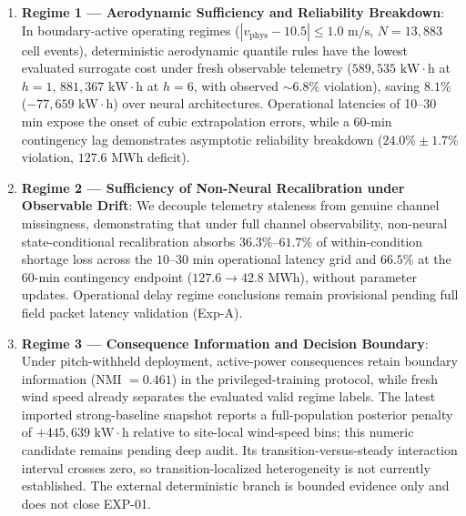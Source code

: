 \documentclass[
  journal]{IEEEtran}
\makeatletter
\providecommand{\tightlist}{%
  \setlength{\itemsep}{0pt}\setlength{\parskip}{0pt}}
\def\section{\@startsection{section}{1}{\z@}{0.75ex plus 0.15ex minus 0.1ex}{0.25ex plus 0.08ex}{\normalfont\footnotesize\bfseries\centering\scshape}}
\makeatother
\begin{document}
\begin{enumerate}
\def\labelenumi{\arabic{enumi}.}
\tightlist
\item
  \textbf{Regime 1 --- Aerodynamic Sufficiency and Reliability
  Breakdown}: In boundary-active operating regimes
  (\(|v_{\text{phys}}-10.5|\le 1.0\text{ m/s}\), \(N=13{,}883\) cell
  events), deterministic aerodynamic quantile rules have the lowest
  evaluated surrogate cost under fresh observable telemetry
  (\(589{,}535\text{ kW}\cdot\text{h}\) at \(h=1\),
  \(881{,}367\text{ kW}\cdot\text{h}\) at \(h=6\), with observed
  \(\sim 6.8\%\) violation), saving \(8.1\%\)
  (\(-77{,}659\text{ kW}\cdot\text{h}\)) over neural architectures.
  Operational latencies of 10--30 min expose the onset of cubic
  extrapolation errors, while a 60-min contingency lag demonstrates
  asymptotic reliability breakdown (\(24.0\% \pm 1.7\%\) violation,
  \(127.6\text{ MWh}\) deficit).
\item
  \textbf{Regime 2 --- Sufficiency of Non-Neural Recalibration under
  Observable Drift}: We decouple telemetry staleness from genuine
  channel missingness, demonstrating that under full channel
  observability, non-neural state-conditional recalibration absorbs
  \(36.3\%\)--\(61.7\%\) of within-condition shortage loss across the
  \(10\)--\(30\) min operational latency grid and \(66.5\%\) at the
  \(60\)-min contingency endpoint (\(127.6 \to 42.8\text{ MWh}\)),
  without parameter updates. Operational delay regime conclusions remain
  provisional pending full field packet latency validation (Exp-A).
\item
  \textbf{Regime 3 --- Consequence Information and Decision Boundary}:
  Under pitch-withheld deployment, active-power consequences retain
  boundary information (NMI \(=0.461\)) in the privileged-training
  protocol, while fresh wind speed already separates the evaluated valid
  regime labels. The latest imported strong-baseline snapshot reports a
  full-population posterior penalty of
  \(+445{,}639\text{ kW}\cdot\text{h}\) relative to site-local
  wind-speed bins; this numeric candidate remains pending deep audit.
  Its transition-versus-steady interaction interval crosses zero, so
  transition-localized heterogeneity is not currently established. The
  external deterministic branch is bounded evidence only and does not
  close EXP-01.
\end{enumerate}

\section{Related Work}\label{related-work}
\end{document}

